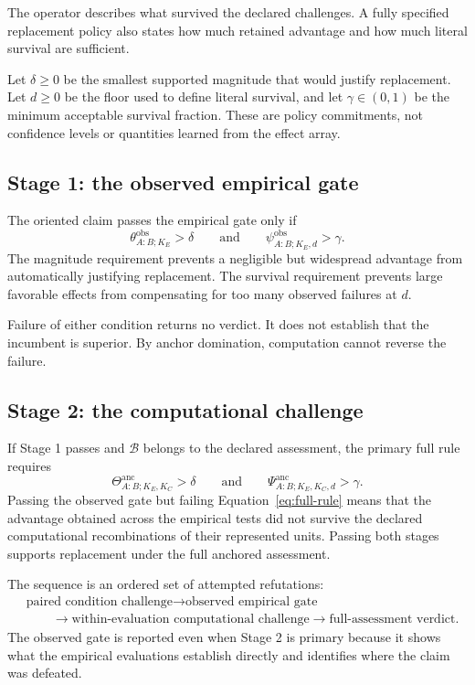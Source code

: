 \documentclass[11pt]{article}
\newcommand{\Boot}{\mathcal{B}}
\newcommand{\Psianc}{\Psi^{\mathrm{anc}}}
\newcommand{\Thetaanc}{\Theta^{\mathrm{anc}}}
\theoremstyle{remark}
\begin{document}
The operator describes what survived the declared challenges. A fully
specified replacement policy also states how much retained advantage and how
much literal survival are sufficient.

Let $\delta\geq0$ be the smallest supported magnitude that would justify
replacement. Let $d\geq0$ be the floor used to define literal survival, and
let $\gamma\in(0,1)$ be the minimum acceptable survival fraction. These are
policy commitments, not confidence levels or quantities learned from the
effect array.

\subsection{Stage 1: the observed empirical gate}

The oriented claim passes the empirical gate only if
\begin{equation}
\theta^{\mathrm{obs}}_{A:B;K_E}>\delta
\qquad\text{and}\qquad
\psi^{\mathrm{obs}}_{A:B;K_E,d}>\gamma.
\label{eq:observed-gate}
\end{equation}
The magnitude requirement prevents a negligible but widespread advantage from
automatically justifying replacement. The survival requirement prevents large
favorable effects from compensating for too many observed failures at $d$.

Failure of either condition returns no verdict. It does not establish that the
incumbent is superior. By anchor domination, computation cannot reverse the
failure.

\subsection{Stage 2: the computational challenge}

If Stage 1 passes and $\Boot$ belongs to the declared assessment, the primary
full rule requires
\begin{equation}
\Thetaanc_{A:B;K_E,K_C}>\delta
\qquad\text{and}\qquad
\Psianc_{A:B;K_E,K_C,d}>\gamma.
\label{eq:full-rule}
\end{equation}
Passing the observed gate but failing Equation~\eqref{eq:full-rule} means that
the advantage obtained across the empirical tests did not survive the declared
computational recombinations of their represented units. Passing both stages
supports replacement under the full anchored assessment.

The sequence is an ordered set of attempted refutations:
\[
\begin{aligned}
&\text{paired condition challenge}
\longrightarrow
\text{observed empirical gate}\\
&\qquad\longrightarrow
\text{within-evaluation computational challenge}
\longrightarrow
\text{full-assessment verdict}.
\end{aligned}
\]
The observed gate is reported even when Stage 2 is primary because it shows
what the empirical evaluations establish directly and identifies where the
claim was defeated.
\end{document}
